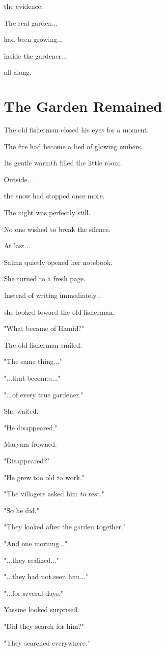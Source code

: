 \documentclass[12pt,openany]{book}
\begin{document}
the evidence.

The real garden...

had been growing...

inside the gardener...

all along.
\section*{The Garden Remained}

The old fisherman closed his eyes for a moment.

The fire had become a bed of glowing embers.

Its gentle warmth filled the little room.

Outside...

the snow had stopped once more.

The night was perfectly still.

No one wished to break the silence.

At last...

Salma quietly opened her notebook.

She turned to a fresh page.

Instead of writing immediately...

she looked toward the old fisherman.

"What became of Hamid?"

The old fisherman smiled.

"The same thing..."

"...that becomes..."

"...of every true gardener."

She waited.

"He disappeared."

Maryam frowned.

"Disappeared?"

"He grew too old to work."

"The villagers asked him to rest."

"So he did."

"They looked after the garden together."

"And one morning..."

"...they realized..."

"...they had not seen him..."

"...for several days."

Yassine looked surprised.

"Did they search for him?"

"They searched everywhere."
\end{document}
